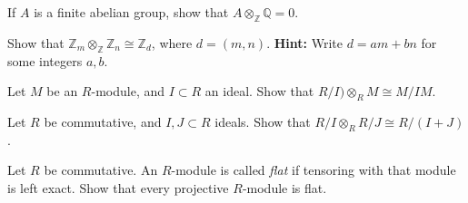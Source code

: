 \documentclass{problemset}
\begin{document}
\begin{exercise}If \(A\) is a finite abelian group, show that \(A \otimes _{\mathbb{Z}} \mathbb{Q} = 0\).
\end{exercise}


\begin{exercise} Show that \(\mathbb{Z}_m \otimes _{\mathbb{Z}} \mathbb{Z}_n \cong \mathbb{Z}_d\), where \(d=(m,n)\).  {\bf Hint: } Write \(d=am+bn\) for some integers \(a,b\). 
\end{exercise}




\begin{exercise} Let \(M\) be an \(R\)-module, and \(I \subset R\) an ideal.  Show that \(R/I) \otimes _R M \cong M/IM\).
\end{exercise}


\begin{exercise} Let \(R\) be commutative, and \(I,J \subset R\) ideals.  Show that \(R/I \otimes _R R/J \cong R/(I+J)\).
\end{exercise}


\begin{exercise} Let \(R\) be commutative.  An \(R\)-module is called {\em flat} if tensoring with that module is left exact.  Show that every projective \(R\)-module is flat.
\end{exercise}







\end{document}
